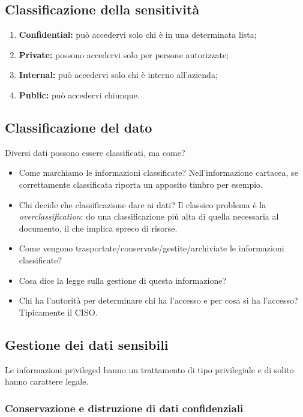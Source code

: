 \subsection{Classificazione della sensitività}

\begin{enumerate}
\item \textbf{Confidential:} può accedervi solo chi è in una determinata lista;
\item \textbf{Private:} possono accedervi solo per persone autorizzate;
\item \textbf{Internal:} può accedervi solo chi è interno all'azienda;
\item \textbf{Public:} può accedervi chiunque.
\end{enumerate}


\subsection{Classificazione del dato}

Diversi dati possono essere classificati, ma come?

\begin{itemize}
\item Come marchiamo le informazioni classificate? Nell'informazione cartacea,
se correttamente classificata riporta un apposito timbro per esempio.
\item Chi decide che classificazione dare ai dati? Il classico problema è la
\textit{overclassification}: do una classificazione più alta di quella 
necessaria al documento, il che implica spreco di risorse.
\item Come vengono trasportate/conservate/gestite/archiviate le informazioni
classificate?
\item Cosa dice la legge sulla gestione di questa informazione?
\item Chi ha l'autorità per determinare chi ha l'accesso e per cosa si ha
l'accesso? Tipicamente il CISO.
\end{itemize}

\subsection{Gestione dei dati sensibili}

Le informazioni privileged hanno un trattamento di tipo privilegiale e di
solito hanno carattere legale.

\subsubsection{Conservazione e distruzione di dati confidenziali}

